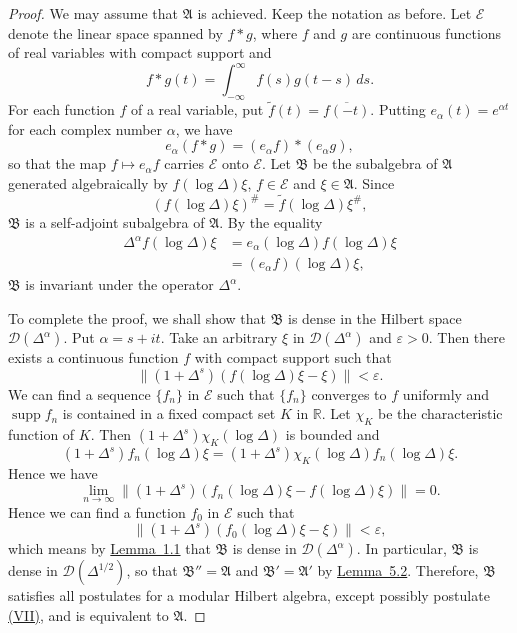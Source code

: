 \documentclass[12pt,b5paper,twoside]{article}
\theoremstyle{takesaki}
\numberwithin{equation}{section}
\newcommand{\modcondref}[1]{\hyperref[cond:2.1:#1]{(#1)}}
\begin{document}
\begin{proof}
We may assume that $\mathfrak A$ is achieved.  Keep the notation as
before.  Let $\mathcal E$ denote the linear space spanned by $f*g$,
where $f$ and $g$ are continuous functions of real variables with
compact support and
\[
  f*g(t)=\int_{-\infty}^{\infty}f(s)g(t-s)\,ds.
\]
For each function $f$ of a real variable, put
$\widetilde f(t)=\overline{f(-t)}$.  Putting
$e_\alpha(t)=e^{\alpha t}$ for each complex number $\alpha$, we have
\[
  e_\alpha(f*g)=(e_\alpha f)*(e_\alpha g),
\]
so that the map $f\mapsto e_\alpha f$ carries $\mathcal E$ onto
$\mathcal E$.  Let $\mathfrak B$ be the subalgebra of $\mathfrak A$
generated algebraically by $f(\log\Delta)\xi$,
$f\in\mathcal E$ and $\xi\in\mathfrak A$.  Since
\[
  (f(\log\Delta)\xi)^{\#}
  =\widetilde f(\log\Delta)\xi^{\#},
\]
$\mathfrak B$ is a self-adjoint subalgebra of $\mathfrak A$.  By the
equality
\begin{align*}
 \Delta^\alpha f(\log\Delta)\xi
 &=e_\alpha(\log\Delta)f(\log\Delta)\xi\\
 &=(e_\alpha f)(\log\Delta)\xi,
\end{align*}
$\mathfrak B$ is invariant under the operator $\Delta^\alpha$.

To complete the proof, we shall show that $\mathfrak B$ is dense in
the Hilbert space $\mathcal D(\Delta^\alpha)$.  Put
$\alpha=s+it$.  Take an arbitrary $\xi$ in
$\mathcal D(\Delta^\alpha)$ and $\varepsilon>0$.  Then there exists a
continuous function $f$ with compact support such that
\[
  \|(1+\Delta^s)(f(\log\Delta)\xi-\xi)\|<\varepsilon.
\]
We can find a sequence $\{f_n\}$ in $\mathcal E$ such that
$\{f_n\}$ converges to $f$ uniformly and $\operatorname{supp}f_n$ is
contained in a fixed compact set $K$ in $\mathbb R$.  Let $\chi_K$ be
the characteristic function of $K$.  Then
$(1+\Delta^s)\chi_K(\log\Delta)$ is bounded and
\[
  (1+\Delta^s)f_n(\log\Delta)\xi
  =(1+\Delta^s)\chi_K(\log\Delta)f_n(\log\Delta)\xi.
\]
Hence we have
\[
  \lim_{n\to\infty}
  \|(1+\Delta^s)(f_n(\log\Delta)\xi-f(\log\Delta)\xi)\|=0.
\]
Hence we can find a function $f_0$ in $\mathcal E$ such that
\[
  \|(1+\Delta^s)(f_0(\log\Delta)\xi-\xi)\|<\varepsilon,
\]
which means by \hyperref[lem:1.1]{Lemma~1.1} that $\mathfrak B$ is
dense in $\mathcal D(\Delta^\alpha)$.  In particular, $\mathfrak B$
is dense in $\mathcal D(\Delta^{1/2})$, so that
$\mathfrak B''=\mathfrak A$ and $\mathfrak B'=\mathfrak A'$ by
\hyperref[lem:5.2]{Lemma~5.2}.  Therefore, $\mathfrak B$ satisfies all
  postulates for a modular Hilbert algebra, except possibly postulate
  \modcondref{VII}, and is equivalent to $\mathfrak A$.


\end{proof}
\end{document}
